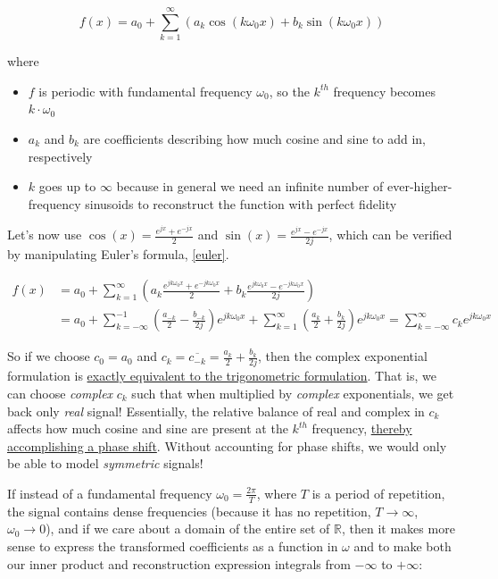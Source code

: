 \documentclass[10pt]{article}
\begin{document}
$$ f(x) = a_0 + \sum_{k=1}^{\infty} (a_k \cos(k \omega_0 x) + b_k \sin(k \omega_0 x))$$

\noindent where
\begin{itemize}[noitemsep, topsep=0pt, after=\newline]
	\item $f$ is periodic with fundamental frequency $\omega_0$, so the $k^{th}$ frequency becomes $k \cdot \omega_0$
	\item $a_k$ and $b_k$ are coefficients describing how much cosine and sine to add in, respectively
	\item $k$ goes up to $\infty$ because in general we need an infinite number of ever-higher-frequency sinusoids to reconstruct the function with perfect fidelity
\end{itemize}

Let's now use $\cos(x) = \frac{e^{jx} + e^{-jx}}{2}$ and $\sin(x) = \frac{e^{jx} - e^{-jx}}{2j}$, which can be verified by manipulating Euler's formula, \autoref{euler}.\vspace{-2mm}

\begin{align*}
f(x) &= a_0 + \sum_{k=1}^{\infty} (a_k \frac{e^{j k \omega_0 x} + e^{-j k \omega_0 x}}{2} + b_k \frac{e^{j k \omega_0 x} - e^{-j k \omega_0 x}}{2j}) \\
&= a_0 + \sum_{k = -\infty}^{-1} (\frac{a_{-k}}{2} - \frac{b_{-k}}{2j}) e^{j k \omega_0 x} + \sum_{k = 1}^{\infty} (\frac{a_k}{2} + \frac{b_k}{2j}) e^{j k \omega_0 x} = \sum_{k = -\infty}^{\infty} c_k e^{j k \omega_0 x}
\end{align*}

\label{phase}
So if we choose $c_0 = a_0$ and $c_k = \overline{c_{-k}} = \frac{a_k}{2} + \frac{b_k}{2j}$, then the complex exponential formulation is \href{http://lpsa.swarthmore.edu/Fourier/Series/DerFS.html}{exactly equivalent to the trigonometric formulation}\cite{swarthmore}. That is, we can choose \textit{complex} $c_k$ such that when multiplied by \textit{complex} exponentials, we get back only \textit{real} signal! Essentially, the relative balance of real and complex in $c_k$ affects how much cosine and sine are present at the $k^{th}$ frequency, \href{https://dsego.github.io/demystifying-fourier/}{thereby accomplishing a phase shift}\cite{sego}. Without accounting for phase shifts, we would only be able to model \textit{symmetric} signals!

If instead of a fundamental frequency $\omega_0 = \frac{2\pi}{T}$, where $T$ is a period of repetition, the signal contains dense frequencies (because it has no repetition, $T \rightarrow \infty$, $\omega_0 \rightarrow 0$), and if we care about a domain of the entire set of $\mathbb{R}$, then it makes more sense to express the transformed coefficients as a function in $\omega$ and to make both our inner product and reconstruction expression integrals from $-\infty$ to $+\infty$:
\end{document}
